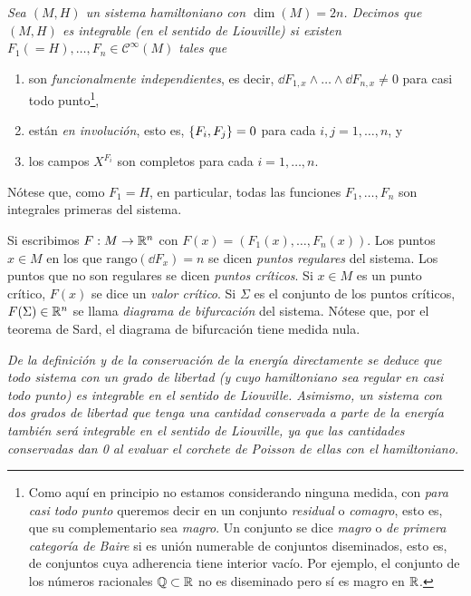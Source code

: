 \begin{defn}
  \em
  Sea $(M,H)$ un sistema hamiltoniano con $\dim(M)=2n$. Decimos que $(M,H)$ es \emph{integrable (en el sentido de Liouville)} si existen $F_1(=H),\dots,F_n\in \mathscr{C}^{\infty}(M)$ tales que
\begin{enumerate}
  \item son \emph{funcionalmente independientes}, es decir, $\dd F_{1,x}\wedge \dots \wedge \dd F_{n,x}\neq 0$ para casi todo punto\footnote{Como aquí en principio no estamos considerando ninguna medida, con \emph{para casi todo punto} queremos decir en un conjunto \emph{residual} o \emph{comagro}, esto es, que su complementario sea \emph{magro}. Un conjunto se dice \emph{magro} o \emph{de primera categoría de Baire} si es unión numerable de conjuntos diseminados, esto es, de conjuntos cuya adherencia tiene interior vacío. Por ejemplo, el conjunto de los números racionales $\mathbb{Q}\subset\mathbb{R}$ no es diseminado pero sí es magro en $\mathbb{R}$. }, 
  \item están \emph{en involución}, esto es, $\left\lbrace F_i,F_j\right\rbrace=0$ para cada $i,j=1,\dots,n$, y
  \item  los campos $X^{F_i}$ son completos para cada $i=1,\dots,n$. 
\end{enumerate}
Nótese que, como $F_1=H$, en particular, todas las funciones $F_1,\dots,F_n$ son integrales primeras del sistema.

Si escribimos $F:M\rightarrow \mathbb{R}^n$ con $F(x)=(F_1(x),\dots,F_n(x))$. Los puntos $x\in M$ en los que $\mathrm{rango} (\dd F_x) =n$ se dicen \emph{puntos regulares} del sistema. Los puntos que no son regulares se dicen \emph{puntos críticos}. Si $x\in M$ es un punto crítico, $F(x)$ se dice un \emph{valor crítico}. Si $\Sigma$ es el conjunto de los puntos críticos, $F(\Sigma)\in \mathbb{R}^n$ se llama \emph{diagrama de bifurcación} del sistema.
 Nótese que, por el teorema de Sard, el diagrama de bifurcación tiene medida nula.
\end{defn}

\begin{obs}
  \em
  De la definición y de la conservación de la energía directamente se deduce que todo sistema con un grado de libertad (y cuyo hamiltoniano sea regular en casi todo punto) es integrable en el sentido de Liouville. Asimismo, un sistema con dos grados de libertad que tenga una cantidad conservada a parte de la energía también será integrable en el sentido de Liouville, ya que las cantidades conservadas dan 0 al evaluar el corchete de Poisson de ellas con el hamiltoniano.
\end{obs}

